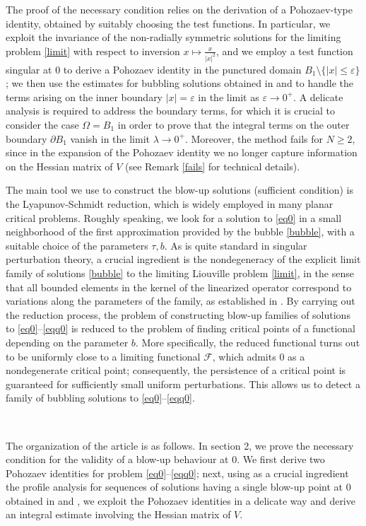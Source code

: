 \documentclass[reqno,11pt]{amsart}
\theoremstyle{definition}
\numberwithin{equation}{section}
\newcommand{\la}{\lambda}
\newcommand{\e}{\varepsilon}
\renewcommand{\(}{\left(}
\renewcommand{\)}{\right)}
\renewcommand{\[}{\left[}
\renewcommand{\]}{\right]}
\begin{document}
{ The proof of the necessary condition relies on the derivation of a Pohozaev-type  identity, obtained  by suitably choosing
the test functions.  In particular,  we exploit the invariance of the non-radially symmetric solutions for the limiting problem \eqref{limit} with respect to inversion $x\mapsto \frac{x}{|x|^2}$,  
and we employ a test function singular at $0$ to derive 
a Pohozaev identity in the punctured domain $B_1\setminus \{|x|\leq \e\}$;  we then use the  estimates   for bubbling solutions obtained in \cite{bara2} and \cite{WeiZhang}  to
handle the terms arising on the inner boundary $|x|=\e$ in the limit as $\e\to 0^+$. 
A delicate analysis is required to address the boundary terms, for which 
it is crucial  
to consider the case $\Omega=B_1$ in order to  prove that the integral  terms on the outer boundary $\partial B_1$ vanish in the limit $\la\to 0^+$. Moreover, the method fails for $N\geq 2$, since in the expansion of the Pohozaev identity we no longer capture information on the Hessian matrix of $V$ (see Remark \ref{fails} for technical details).


 The main tool we use to construct the blow-up solutions (sufficient condition) is the Lyapunov-Schmidt reduction,
which is widely employed in many planar critical problems. Roughly speaking, 
we look for a solution to \eqref{eq0} in a small neighborhood of the first approximation provided by the bubble \eqref{bubble},  with a suitable choice of the parameters $\tau, b$. As is quite standard in singular perturbation theory, a crucial ingredient is the nondegeneracy of the explicit
limit
family of solutions \eqref{bubble} to the limiting Liouville problem \eqref{limit}, in the sense that all bounded elements in the kernel of the linearized operator correspond to variations along the parameters of
the family, as established in \cite{delespomu}.  By carrying out the reduction process,  the problem of constructing blow-up families of solutions to \eqref{eq0}--\eqref{eqq0} is reduced  to the problem of finding critical points of a functional depending on the parameter $b$. More specifically, the reduced functional turns out to be
 uniformly close to a limiting  functional ${\mathcal F}$, which admits  $0$ as   a nondegenerate critical point;  consequently, the persistence of a critical point    is guaranteed for sufficiently small uniform perturbations. This allows us to detect a family of bubbling solutions to \eqref{eq0}--\eqref{eqq0}. 

 
 \
 
 The organization of the article is as follows. In section 2, we prove the   necessary condition for the validity of a blow-up behaviour at $0$. We first   derive two Pohozaev identities for  problem \eqref{eq0}--\eqref{eqq0}; next, using as a crucial ingredient the profile analysis for sequences of solutions having a single blow-up point at $0$  obtained in \cite{bara2} and \cite{WeiZhang}, 
we exploit the Pohozaev identities in a delicate way and derive an integral estimate involving the Hessian matrix of $V$. 

}
\end{document}
